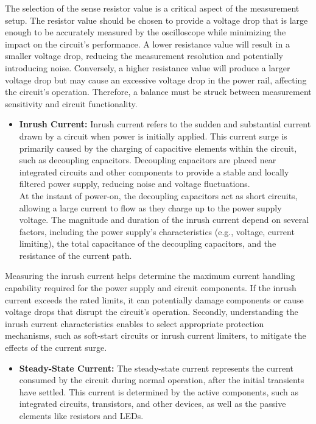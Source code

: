 \documentclass[a4paper,11pt]{article}%
\begin{document}
The selection of the sense resistor value is a critical aspect of the measurement setup. The resistor value should be chosen to provide a voltage drop that is large enough to be accurately measured by the oscilloscope while minimizing the impact on the circuit's performance. A lower resistance value will result in a smaller voltage drop, reducing the measurement resolution and potentially introducing noise. Conversely, a higher resistance value will produce a larger voltage drop but may cause an excessive voltage drop in the power rail, affecting the circuit's operation. Therefore, a balance must be struck between measurement sensitivity and circuit functionality.

\begin{itemize}
	\item \textbf{Inrush Current:} Inrush current refers to the sudden and substantial current drawn by a circuit when power is initially applied. This current surge is primarily caused by the charging of capacitive elements within the circuit, such as decoupling capacitors. Decoupling capacitors are placed near integrated circuits and other components to provide a stable and locally filtered power supply, reducing noise and voltage fluctuations.\\
	      At the instant of power-on, the decoupling capacitors act as short circuits, allowing a large current to flow as they charge up to the power supply voltage. The magnitude and duration of the inrush current depend on several factors, including the power supply's characteristics (e.g., voltage, current limiting), the total capacitance of the decoupling capacitors, and the resistance of the current path.
\end{itemize}


Measuring the inrush current helps determine the maximum current handling capability required for the power supply and circuit components. If the inrush current exceeds the rated limits, it can potentially damage components or cause voltage drops that disrupt the circuit's operation. Secondly, understanding the inrush current characteristics enables to select appropriate protection mechanisms, such as soft-start circuits or inrush current limiters, to mitigate the effects of the current surge.

\begin{itemize}
	\item \textbf{Steady-State Current:} The steady-state current represents the current consumed by the circuit during normal operation, after the initial transients have settled. This current is determined by the active components, such as integrated circuits, transistors, and other devices, as well as the passive elements like resistors and LEDs.
\end{itemize}
\end{document}
